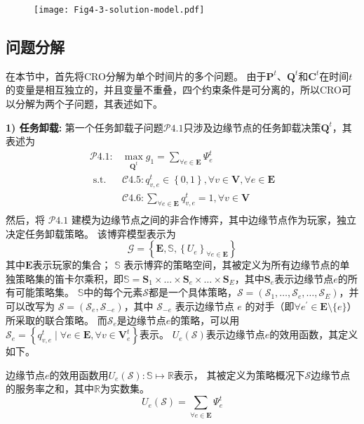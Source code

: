 \begin{figure}[h]
\centering
  \texttt{[image: Fig4-3-solution-model.pdf]}
  \label{fig 4-3}
\end{figure} 

\subsection{问题分解}
在本节中，首先将CRO分解为单个时间片的多个问题。
由于$\mathbf{P}^{t}$、$\mathbf{Q}^{t}$和$\mathbf{C}^{t}$在时间$t$的变量是相互独立的，并且变量不重叠，四个约束条件是可分离的，所以CRO可以分解为两个子问题，其表述如下。

\textbf{1) 任务卸载:} 第一个任务卸载子问题$\mathcal{P}4.1$只涉及边缘节点的任务卸载决策$\mathbf{Q}^{t}$，其表述为
\begin{equation}
	\begin{aligned}
		\mathcal{P}4.1: &\max_{\mathbf{Q}^{t}} g_1= \sum_{ \forall e \in \mathbf{E}} \Psi_{e}^{t}  \\
		\text { s.t. }  
		&\mathcal{C}4.5: q_{v, e}^t \in \left \{0, 1\right \}, \forall v \in \mathbf{V}, \forall e \in \mathbf{E}  \\
        &\mathcal{C}4.6: \sum_{\forall e \in \mathbf{E}} q_{v, e}^t = 1, \forall v \in \mathbf{V} \\
	\end{aligned}
\end{equation}
然后，将 $\mathcal{P}4.1$ 建模为边缘节点之间的非合作博弈，其中边缘节点作为玩家，独立决定任务卸载策略。
该博弈模型表示为
\begin{equation}
	\mathcal{G} = \left\{\mathbf{E}, \mathbb{S}, \left\{{U}_{e}\right\}_{\forall e \in \mathbf{E}} \right\}
\end{equation}
其中$\mathbf{E}$表示玩家的集合；
$\mathbb{S}$ 表示博弈的策略空间，其被定义为所有边缘节点的单独策略集的笛卡尔乘积，即$\mathbb{S} = \mathbf{S}_{1} \times \ldots \times \mathbf{S}_{e} \times \ldots \times \mathbf{S}_{E}$，其中$\mathbf{S}_{e}$表示边缘节点$e$的所有可能策略集。
$\mathbb{S}$中的每个元素$\mathcal{S}$都是一个具体策略，$\mathcal{S} = \left(\mathcal{S}_{1}, \ldots, \mathcal{S}_{e}, \ldots, \mathcal{S}_{E} \right)$，并可以改写为 $\mathcal{S}=\left( \mathcal{S}_{e}, \mathcal{S}_{-e}\right)$，其中 $\mathcal{S}_{-e}$ 表示边缘节点 $e$ 的对手（即$\forall e^{\prime} \in \mathbf{E} \setminus \{e\}$）所采取的联合策略。
而$\mathcal{S}_{e}$是边缘节点$e$的策略，可以用$\mathcal{S}_{e} = \left\{ q_{v, e}^t \mid \forall e \in \mathbf{E}, \forall v \in \mathbf{V}_{e}^{t} \right\}$表示。
${U}_{e}\left(\mathcal{S}\right)$表示边缘节点$e$的效用函数，其定义如下。
\begin{definition}
边缘节点$e$的效用函数用${U}_{e}\left(\mathcal{S}\right): \mathbb{S} \mapsto \mathbb{R}$表示， 其被定义为策略概况下$\mathcal{S}$边缘节点的服务率之和，其中$\mathbb{R}$为实数集。
	\begin{equation}
		{U}_{e}\left(\mathcal{S}\right) = \sum_{\forall e \in \mathbf{E}} \Psi_{e}^{t}
	\end{equation}
\end{definition}

